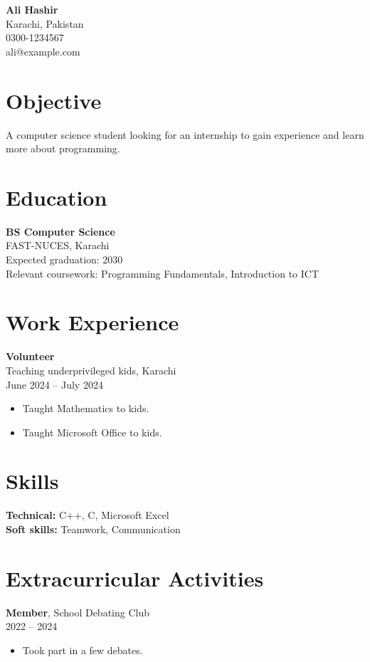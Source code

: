 \documentclass{article}
\begin{document}
\begin{center}
{\Large \textbf{Ali Hashir}}\\
Karachi, Pakistan\\
0300-1234567\\
ali@example.com
\end{center}

\section*{Objective}
A computer science student looking for an internship to gain experience and learn more about programming.

\section*{Education}
\textbf{BS Computer Science}\\
FAST-NUCES, Karachi\\
Expected graduation: 2030\\
Relevant coursework: Programming Fundamentals, Introduction to ICT

\section*{Work Experience}
\textbf{Volunteer}\\
Teaching underprivileged kids, Karachi\\
June 2024 -- July 2024
\begin{itemize}
    \item Taught Mathematics to kids.
    \item Taught Microsoft Office to kids.
\end{itemize}

\section*{Skills}
\textbf{Technical:} C++, C, Microsoft Excel\\
\textbf{Soft skills:} Teamwork, Communication

\section*{Extracurricular Activities}
\textbf{Member}, School Debating Club\\
2022 -- 2024
\begin{itemize}
    \item Took part in a few debates.
\end{itemize}
\end{document}
